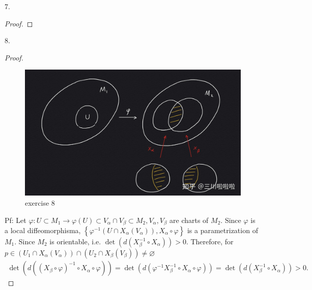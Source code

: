 7.
\begin{proof}
    
\end{proof}
8. 
\begin{proof}
\begin{figure}[htbp]
    \centering
    \includegraphics[width=.5\linewidth]{figures/ex8.jpg}
    \caption{exercise 8}
    \label{fig:ex8}
\end{figure}
    Pf: Let $\varphi: U \subset M_1 \rightarrow \varphi(U) \subset V_\alpha \cap V_\beta \subset M_2, V_\alpha, V_\beta$ are charts of $M_2$. Since $\varphi$ is a local diffeomorphisma, $\left\{\varphi^{-1}\left(U \cap X_\alpha\left(V_\alpha\right)\right), X_\alpha \circ \varphi\right\}$ is a parametrization of $M_1$. Since $M_2$ is orientable, i.e. $\operatorname{det}\left(d\left(X_\beta^{-1} \circ X_\alpha\right)\right)>0$. Therefore, for $p \in\left(U_1 \cap X_\alpha\left(V_\alpha\right)\right) \cap\left(U_2 \cap X_\beta\left(V_\beta\right)\right) \neq \varnothing$
\begin{align*}
\operatorname{det}\left(d\left(\left(X_\beta \circ \varphi\right)^{-1} \circ X_\alpha \circ \varphi\right)\right)=\operatorname{det}\left(d\left(\varphi^{-1} X_\beta^{-1} \circ X_\alpha \circ \varphi\right)\right)=\operatorname{det}\left(d\left(X_\beta^{-1} \circ X_\alpha\right)\right)>0 .
\end{align*}
\end{proof}


